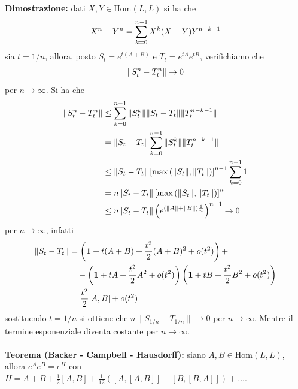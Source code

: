\documentclass{article}
\begin{document}
\textbf{Dimostrazione:} dati $X, Y \in \mathrm{Hom}(L, L)$ si ha che
\begin{gather}
    X^n - Y^n = \sum_{k = 0}^{n - 1}X^k(X - Y)Y^{n - k - 1} \notag
\end{gather}
sia $t = 1/n$, allora, posto $S_t = e^{t(A + B)}$ e $T_t = e^{tA}e^{tB}$, verifichiamo che
\begin{align}
    \|S^n_t - T^n_t\| \rightarrow 0 \notag
\end{align}
per $n \rightarrow \infty$. Si ha che
\begin{align}
    \|S^n_t - T^n_t\| &\leq \sum_{k = 0}^{n - 1}\|S^k_t\|\|S_t - T_t\|\|T^{n - k - 1}_t\| \notag \\
    &= \|S_t - T_t\|\sum_{k = 0}^{n - 1}\|S^k_t\|\|T^{n - k - 1}_t\| \notag \\
    &\leq \|S_t - T_t\|\left[\max\left(\|S_t\|, \|T_t\|\right)\right]^{n - 1}\sum_{k = 0}^{n - 1}1 \notag \\
    &= n\|S_t - T_t\|\left[\max\left(\|S_t\|, \|T_t\|\right)\right]^n \notag \\
    &\leq n\|S_t - T_t\|\left(e^{(\|A\| + \|B\|)\frac{1}{n}}\right)^{n - 1} \rightarrow 0 \notag
\end{align}
per $n \rightarrow \infty$, infatti
\begin{align}
    \|S_t - T_t\| &= \left(\mathbf{1} + t(A + B) + \frac{t^2}{2}(A + B)^2 + o(t^2)\right) + \notag \\
    &\quad -\left(\mathbf{1} + tA + \frac{t^2}{2}A^2 + o(t^2)\right)\left(\mathbf{1} + tB + \frac{t^2}{2}B^2 + o(t^2)\right) \notag \\
    &= \frac{t^2}{2}[A, B] + o(t^2) \notag
\end{align}
sostituendo $t = 1/n$ si ottiene che $n\|S_{1/n} - T_{1/n}\| \rightarrow 0$ per $n \rightarrow \infty$. Mentre il termine esponenziale diventa costante per $n \rightarrow \infty$. \\ \\
\textbf{Teorema (Backer - Campbell - Hausdorff):} siano $A, B \in \mathrm{Hom}(L, L)$, allora $e^Ae^B = e^H$ con $H = A + B + \frac{1}{2}[A, B] + \frac{1}{12}\left([A, [A, B]] + [B, [B, A]]\right) + \dots$. \\
\end{document}
